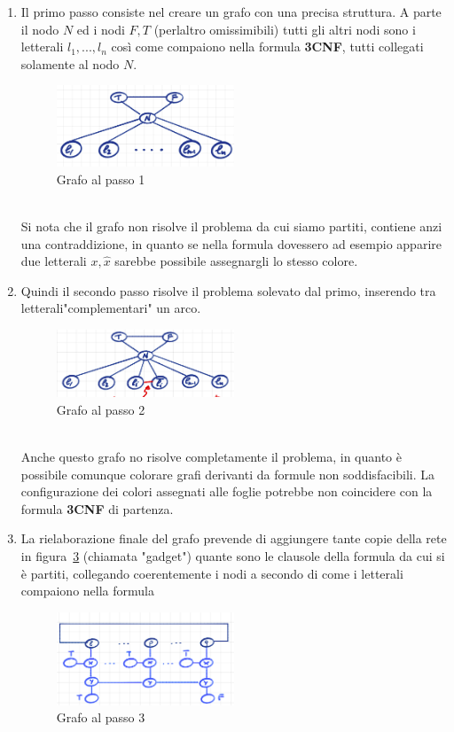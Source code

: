 \documentclass[a4paper]{article}
\begin{document}
\begin{enumerate}
	\item Il primo passo consiste nel creare un grafo con una precisa struttura.
		A parte il nodo $N$ ed i nodi $F,T$ (perlaltro omissimibili) tutti gli altri nodi sono i letterali $l_1,...,l_n$ così come compaiono nella formula \textbf{3CNF}, tutti collegati solamente al nodo $N$.
		\begin{figure}[!ht]
		\centering
		\includegraphics[width = 0.5\textwidth]{./img/E10_passo1.png}
		\caption{Grafo al passo 1} \label{FIG:E10_passo1}
		\end{figure}\\
		Si nota che il grafo non risolve il problema da cui siamo partiti, contiene anzi una contraddizione, in quanto se nella formula dovessero ad esempio apparire due letterali ${x,\hat x}$ sarebbe possibile assegnargli lo stesso colore.
	\item Quindi il secondo passo risolve il problema solevato dal primo, inserendo tra letterali"complementari" un arco.
		\begin{figure}[!ht]
		\centering
		\includegraphics[width = 0.5\textwidth]{./img/E10_passo2.png}
		\caption{Grafo al passo 2} \label{FIG:E10_passo2}
		\end{figure}\\
		Anche questo grafo no risolve completamente il problema, in quanto è possibile comunque colorare grafi derivanti da formule non soddisfacibili.
		La configurazione dei colori assegnati alle foglie potrebbe non coincidere con la formula \textbf{3CNF} di partenza.
	\item La rielaborazione finale del grafo prevende di aggiungere tante copie della rete in figura~\ref{FIG:E10_passo3} (chiamata "gadget") quante sono le clausole della formula da cui si è partiti, collegando coerentemente i nodi a secondo di come i letterali compaiono nella formula
		\begin{figure}[!ht]
		\centering
		\includegraphics[width = 0.5\textwidth]{./img/E10_passo3.png}
		\caption{Grafo al passo 3} \label{FIG:E10_passo3}
		\end{figure}\\
\end{enumerate}
\end{document}
